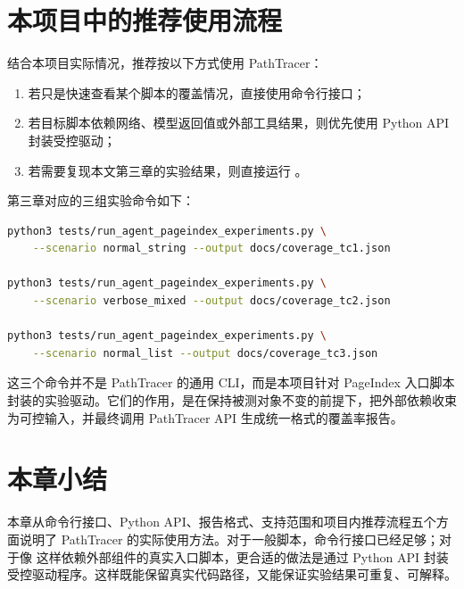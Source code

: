 \section{本项目中的推荐使用流程}

结合本项目实际情况，推荐按以下方式使用 PathTracer：

\begin{enumerate}
    \item 若只是快速查看某个脚本的覆盖情况，直接使用命令行接口；
    \item 若目标脚本依赖网络、模型返回值或外部工具结果，则优先使用 Python API 封装受控驱动；
    \item 若需要复现本文第三章的实验结果，则直接运行 。
\end{enumerate}

第三章对应的三组实验命令如下：

\begin{lstlisting}[language=bash, caption={本项目推荐的实验执行命令}]
python3 tests/run_agent_pageindex_experiments.py \
    --scenario normal_string --output docs/coverage_tc1.json

python3 tests/run_agent_pageindex_experiments.py \
    --scenario verbose_mixed --output docs/coverage_tc2.json

python3 tests/run_agent_pageindex_experiments.py \
    --scenario normal_list --output docs/coverage_tc3.json
\end{lstlisting}

这三个命令并不是 PathTracer 的通用 CLI，而是本项目针对 PageIndex 入口脚本封装的实验驱动。它们的作用，是在保持被测对象不变的前提下，把外部依赖收束为可控输入，并最终调用 PathTracer API 生成统一格式的覆盖率报告。

\section{本章小结}

本章从命令行接口、Python API、报告格式、支持范围和项目内推荐流程五个方面说明了 PathTracer 的实际使用方法。对于一般脚本，命令行接口已经足够；对于像  这样依赖外部组件的真实入口脚本，更合适的做法是通过 Python API 封装受控驱动程序。这样既能保留真实代码路径，又能保证实验结果可重复、可解释。
